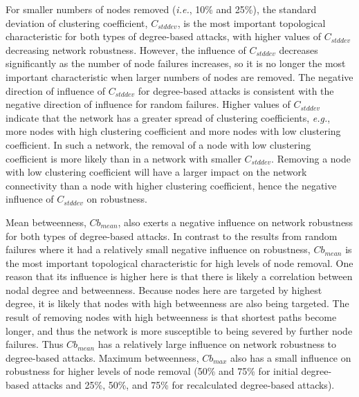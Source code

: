 
For smaller numbers of nodes removed (\emph{i.e.}, 10\% and 25\%), the standard deviation of clustering coefficient, $C_{std dev}$, is the most important topological characteristic for both types of degree-based attacks, with higher values of $C_{std dev}$ decreasing network robustness.  However, the influence of $C_{std dev}$ decreases significantly as the number of node failures increases, so it is no longer the most important characteristic when larger numbers of nodes are removed. The negative direction of influence of $C_{std dev}$ for degree-based attacks is consistent with the negative direction of influence for random failures. Higher values of $C_{std dev}$ indicate that the network has a greater spread of clustering coefficients, \emph{e.g.}, more nodes with high clustering coefficient and more nodes with low clustering coefficient.  In such a network, the removal of a node with low clustering coefficient is more likely than in a network with smaller $C_{std dev}$. Removing a node with low clustering coefficient will have a larger impact on the network connectivity than a node with higher clustering coefficient, hence the negative influence of $C_{std dev}$ on robustness.

Mean betweenness, $Cb_{mean}$, also exerts a negative influence on network robustness for both types of degree-based attacks.  In contrast to the results from random failures where it had a relatively small negative influence on robustness, $Cb_{mean}$ is the most important topological characteristic for high levels of node removal. One reason that its influence is higher here is that there is likely a correlation between nodal degree and betweenness. Because nodes here are targeted by highest degree, it is likely that nodes with high betweenness are also being targeted. The result of removing nodes with high betweenness is that shortest paths become longer, and thus the network is more susceptible to being severed by further node failures.  Thus $Cb_{mean}$ has a relatively large influence on network robustness to degree-based attacks.  Maximum betweenness, $Cb_{max}$ also has a small influence on robustness for higher levels of node removal (50\% and 75\% for initial degree-based attacks and 25\%, 50\%, and 75\% for recalculated degree-based attacks).

